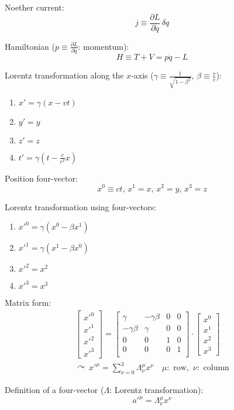 \documentclass[fontsize=11pt,a4paper]{scrartcl}
\begin{document}
Noether current:
\[
	j\equiv\frac{\partial L}{\partial\dot q}\,\delta q
\]

Hamiltonian ($p\equiv\frac{\partial L}{\partial\dot q}$: momentum):
\[
	H\equiv T+V=p\dot q-L
\]

Lorentz transformation along the $x$-axis ($\gamma\equiv\frac{1}{\sqrt{1-\beta^2}}$, $\beta\equiv\frac{v}{c}$):
\begin{enumerate}
	\item $x'=\gamma(x-vt)$
	\item $y'=y$
	\item $z'=z$
	\item $t'=\gamma(t-\frac{v}{c^2}x)$
\end{enumerate}

Position four-vector:
\[
	x^0\equiv ct,\,x^1=x,\,x^2=y,\,x^3=z
\]

Lorentz transformation using four-vectors:
\begin{enumerate}
	\item $x'^0=\gamma(x^0-\beta x^1)$
	\item $x'^1=\gamma(x^1-\beta x^0)$
	\item $x'^2=x^2$
	\item $x'^3=x^3$
\end{enumerate}

Matrix form:
\begin{gather*}
	\begin{bmatrix}x'^0\\x'^1\\x'^2\\x'^3\end{bmatrix}=\begin{bmatrix}\gamma & -\gamma\beta & 0 & 0\\ -\gamma\beta & \gamma & 0 & 0\\ 0 & 0 & 1 & 0\\ 0 & 0 & 0 & 1\\\end{bmatrix}\cdot\begin{bmatrix}x^0\\x^1\\x^2\\x^3\end{bmatrix}\\
	\curvearrowright\,x'^\mu=\sum_{\nu=0}^3 \Lambda^\mu_\nu x^\nu\quad\mu:\text{ row},\,\,\nu:\text{ column}
\end{gather*}

Definition of a four-vector ($\Lambda$: Lorentz transformation):
\[
	a'^\mu=\Lambda^\mu_\nu x^\nu
\]
\end{document}
